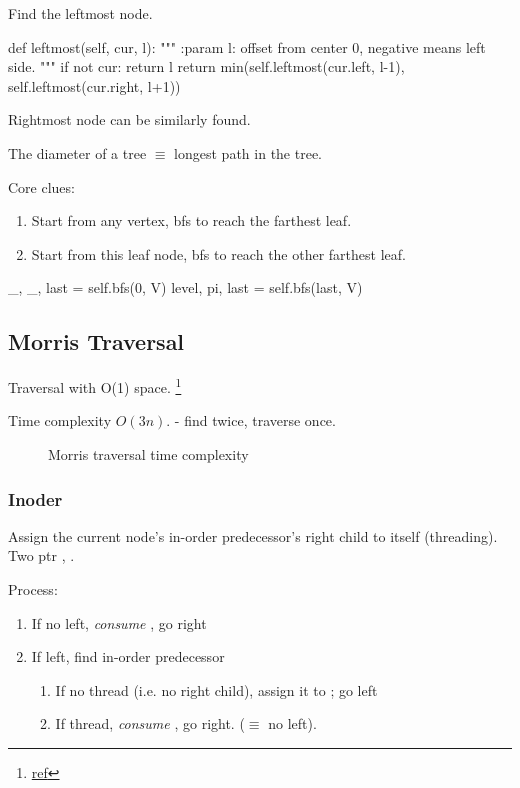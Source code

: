  Find the leftmost node. 
\begin{python}
def leftmost(self, cur, l):
    """
    :param l: offset from center 0, negative means left side. 
    """
    if not cur: return l
    return min(self.leftmost(cur.left, l-1), 
               self.leftmost(cur.right, l+1))
\end{python}

Rightmost node can be similarly found.

 The diameter of a tree $\equiv$ longest path in the tree.

Core clues:
\begin{enumerate}
\item Start from any vertex, bfs to reach the farthest leaf.
\item Start from this leaf node, bfs to reach the other farthest leaf. 
\end{enumerate}
\begin{python}
_, _, last = self.bfs(0, V)
level, pi, last = self.bfs(last, V)
\end{python}

\subsection{Morris Traversal} 
Traversal with O(1) space. \footnote{\href{http://www.cnblogs.com/AnnieKim/archive/2013/06/15/MorrisTraversal.html}{ref}}

Time complexity $O(3n).$ - find  twice,  traverse once. \begin{figure}[hbtp]
\centering
{}
\caption{Morris traversal time complexity}
\label{fig:morrisTime}
\end{figure}

\subsubsection{Inoder}
Assign the current node's in-order predecessor's right child to itself (threading). Two ptr , . 

Process:
\begin{enumerate}
\item If no left, \textit{consume} , go right 
\item If left, find in-order predecessor 
\begin{enumerate}
\item If no thread (i.e. no  right child), assign it to ; go left
\item If thread, \textit{consume} , go right. ($\equiv$ no left). 
\end{enumerate}
\end{enumerate}

